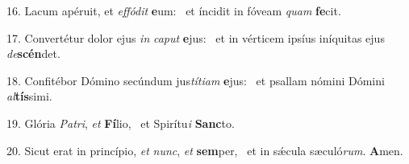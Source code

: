16. Lacum apéruit, et \textit{ef}\textit{fó}\textit{dit} \textbf{e}um: \ast\  et íncidit in fóveam \textit{quam} \textbf{fe}cit.\

17. Convertétur dolor ejus \textit{in} \textit{ca}\textit{put} \textbf{e}jus: \ast\  et in vérticem ipsíus iníquitas ejus \textit{de}\textbf{scén}det.\

18. Confitébor Dómino secúndum jus\textit{tí}\textit{ti}\textit{am} \textbf{e}jus: \ast\  et psallam nómini Dómini \textit{al}\textbf{tís}simi.\

19. Glória \textit{Pa}\textit{tri}, \textit{et} \textbf{Fí}lio, \ast\  et Spirítu\textit{i} \textbf{Sanc}to.\

20. Sicut erat in princípio, \textit{et} \textit{nunc}, \textit{et} \textbf{sem}per, \ast\  et in sǽcula sæculó\textit{rum}. \textbf{A}men.\

